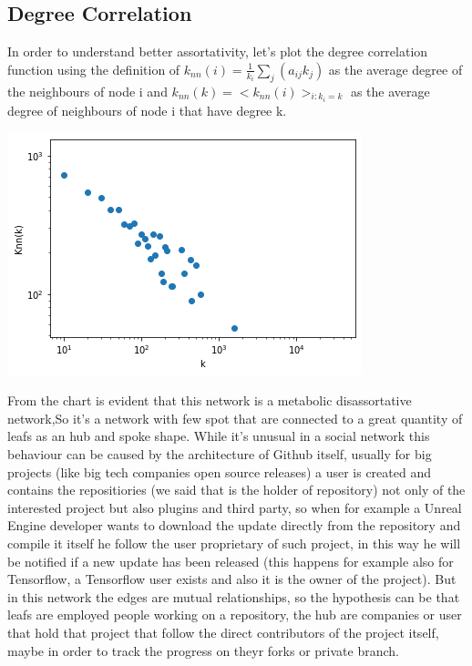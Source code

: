 \documentclass[]{article}
\begin{document}
    \subsection*{Degree Correlation}
    In order to understand better assortativity, let's plot the degree correlation function using the definition of $k_{nn}(i)= \frac{1}{k_i}\sum_j(a_{ij}k_j)$ as the average degree of the neighbours of node i and $k_{nn}(k) = <k_{nn}(i)>_{i:k_i=k}$ as the average degree of neighbours of node i that have degree k.
    \begin{center}
        \includegraphics*[scale=0.5]{charts/assort_plot.png}
    \end{center}
    From the chart is evident that this network is a metabolic disassortative network,So it's a network with few spot that are connected to a great quantity of leafs as an hub and spoke shape. While it's unusual in a social network this behaviour can be caused by the architecture of Github itself, usually for big projects (like big tech companies open source releases) a user is created and contains the repositiories (we said that is the holder of repository) not only of the interested project but also plugins and third party, so when for example a Unreal Engine developer wants to download the update directly from the repository and compile it itself he follow the user proprietary of such project, in this way he will be notified if a new update has been released (this happens for example also for Tensorflow, a Tensorflow user exists and also it is the owner of the project). But in this network the edges are mutual relationships, so the hypothesis can be that leafs are employed people working on a repository, the hub are companies or user that hold that project that follow the direct contributors of the project itself, maybe in order to track the progress on theyr forks or private branch.
\end{document}
